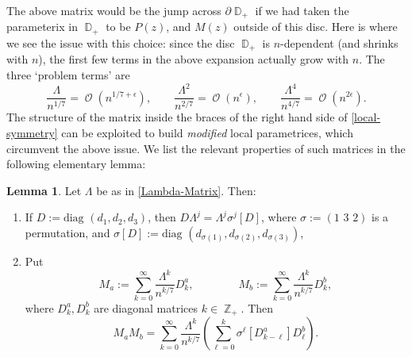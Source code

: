 \documentclass[usenames,dvipsnames]{article}
\theoremstyle{definition}
\newtheorem{lemma}{Lemma}[section]
\DeclareMathOperator{\DD}{\mathbb{D}}
\DeclareMathOperator{\ZZ}{\mathbb{Z}}
\DeclareMathOperator{\OO}{\mathcal{O}}
\numberwithin{equation}{section}
\numberwithin{figure}{section}
\begin{document}
The above matrix would be the jump across $\partial \DD_+$ if we had taken the parameterix in $\DD_+$ to be $P(z)$, and $M(z)$ outside of this disc. 
Here is where we see the issue with this choice: since the disc $\DD_+$ is $n$-dependent (and shrinks with $n$), the first few terms in the above expansion actually grow with $n$. The three `problem terms' are
    \begin{equation}\label{blowup-terms}
        \frac{\Lambda}{n^{1/7}} = \OO(n^{1/7+\epsilon}), \qquad \frac{\Lambda^2}{n^{2/7}} = \OO(n^{\epsilon}),\qquad \frac{\Lambda^4}{n^{4/7}} = \OO(n^{2\epsilon}).
    \end{equation}
The structure of the matrix inside the braces of the right hand side of \eqref{local-symmetry} can be exploited to build \textit{modified} local parametrices, which circumvent the above issue. We list the relevant properties of such matrices in the following elementary lemma:
\begin{lemma}
    Let $\Lambda$ be as in \eqref{Lambda-Matrix}.  Then:
    \begin{enumerate}
        \item If $D:=\text{diag }(d_1,d_2,d_3)$, then $D\Lambda^{j}=\Lambda^j\sigma^{j}[D]$, where $\sigma:=(1\,\, 3\,\, 2)$ is a permutation, and
        $\sigma[D]:=\text{diag }(d_{\sigma(1)},d_{\sigma(2)},d_{\sigma(3)})$,
        \item Put
        \begin{equation*}
            M_a:=\sum_{k=0}^{\infty}\frac{\Lambda^k}{n^{k/7}}D_k^a,\qquad\qquad M_b:=\sum_{k=0}^{\infty}\frac{\Lambda^k}{n^{k/7}}D_k^b,
        \end{equation*}
        where $D_k^a,D_k^b$ are diagonal matrices $k\in \ZZ_+$. Then
            \begin{equation*}
                M_aM_b = \sum_{k=0}^{\infty}\frac{\Lambda^k}{n^{k/7}}\left(\sum_{\ell=0}^k \sigma^{\ell}\left[D_{k-\ell}^a\right]D_{\ell}^b\right).
            \end{equation*}
    \end{enumerate}
\end{lemma}
\end{document}
